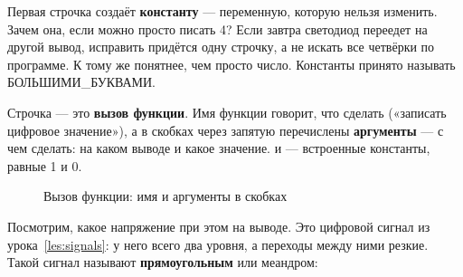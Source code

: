 Первая строчка  создаёт \textbf{константу} --- переменную, которую нельзя
изменить. Зачем она, если можно просто писать 4? Если завтра светодиод переедет на другой вывод,
исправить придётся одну строчку, а не искать все четвёрки по программе. К тому же 
понятнее, чем просто число. Константы принято называть БОЛЬШИМИ\_БУКВАМИ.

Строчка  --- это \textbf{вызов функции}. Имя функции говорит, что сделать
(«записать цифровое значение»), а в скобках через запятую перечислены \textbf{аргументы} --- с чем сделать:
на каком выводе и какое значение.  и  --- встроенные константы, равные 1 и 0.

\begin{figure}[H]
\centering
{}
\caption{Вызов функции: имя и аргументы в скобках}
\end{figure}


Посмотрим, какое напряжение при этом на выводе. Это цифровой сигнал из урока~\ref{les:signals}:
у него всего два уровня, а переходы между ними резкие. Такой сигнал называют \textbf{прямоугольным}
или меандром:

